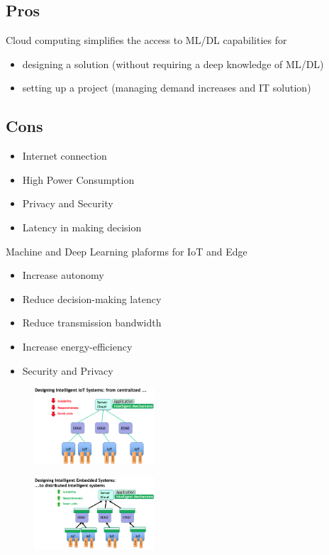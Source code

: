 \documentclass[10pt, oneside]{article}
\begin{document}
\begin{multicols}{2}
    \subsection*{Pros}
    Cloud computing simplifies the access to ML/DL capabilities for\begin{itemize}
        \item designing a
        solution (without requiring a deep knowledge of ML/DL)
        \item setting up a project (managing
        demand increases and IT solution)
    \end{itemize}
    \columnbreak
    \subsection*{Cons}
    \begin{itemize}
        \item Internet connection
        \item High Power
        Consumption
        \item Privacy and Security
        \item Latency in making
        decision
    \end{itemize}
\end{multicols}
Machine and Deep Learning plaforms for IoT and Edge\begin{itemize}
    \item Increase autonomy
    \item Reduce decision-making latency 
    \item Reduce transmission bandwidth 
    \item Increase energy-efficiency
    \item Security and Privacy
\end{itemize}
\begin{multicols}{2}
    \begin{figure}[H]
        \begin{center}
        \includegraphics[width=0.4\textwidth]{img/img60.png}
        \end{center}
    \end{figure}
    \columnbreak
    \begin{figure}[H]
        \begin{center}
        \includegraphics[width=0.4\textwidth]{img/img61.png}
        \end{center}
    \end{figure}
\end{multicols}
\end{document}
